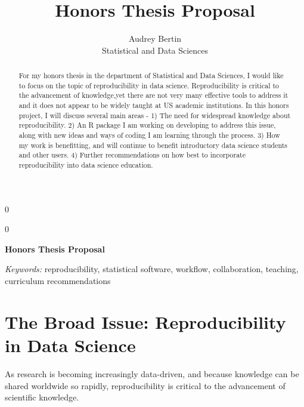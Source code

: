 \documentclass[12pt]{article}
\newcommand{\blind}{0}
\begin{document}
\def\spacingset#1{\renewcommand{\baselinestretch}%
{#1}\small\normalsize} \spacingset{1}



\blind
{
  \title{\bf Honors Thesis Proposal}

  \author{
        Audrey Bertin \\
    Statistical and Data Sciences\\
      }
  \maketitle
} \fi

\blind
{
  \bigskip
  \bigskip
  \bigskip
  \begin{center}
    {\LARGE\bf Honors Thesis Proposal}
  \end{center}
  \medskip
} \fi

\bigskip
\begin{abstract}
For my honors thesis in the department of Statistical and Data Sciences,
I would like to focus on the topic of reproducibility in data science.
Reproducibility is critical to the advancement of knowledge,yet there
are not very many effective tools to address it and it does not appear
to be widely taught at US academic institutions. In this honors project,
I will discuss several main areas - 1) The need for widespread knowledge
about reproducibility. 2) An R package I am working on developing to
address this issue, along with new ideas and ways of coding I am
learning through the process. 3) How my work is benefitting, and will
continue to benefit introductory data science students and other users.
4) Further recommendations on how best to incorporate reproducibility
into data science education.
\end{abstract}

\noindent%
{\it Keywords:} reproducibility, statistical software, workflow, collaboration, teaching, curriculum recommendations
\vfill

\newpage
\spacingset{1.45} %

\section{The Broad Issue: Reproducibility in Data
Science}\label{the-broad-issue-reproducibility-in-data-science}

As research is becoming increasingly data-driven, and because knowledge
can be shared worldwide so rapidly, reproducibility is critical to the
advancement of scientific knowledge.
\end{document}
